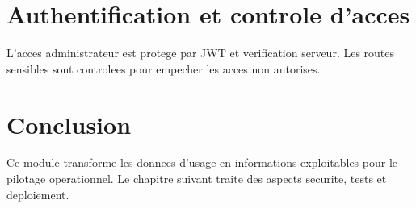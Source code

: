 \section{Authentification et controle d'acces}
L'acces administrateur est protege par JWT et verification serveur. Les routes sensibles sont controlees pour empecher les acces non autorises.

\section{Conclusion}
Ce module transforme les donnees d'usage en informations exploitables pour le pilotage operationnel. Le chapitre suivant traite des aspects securite, tests et deploiement.
